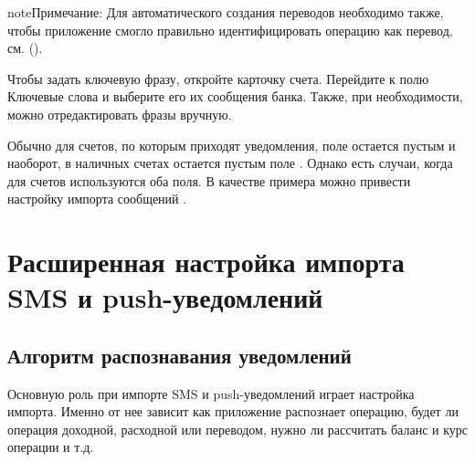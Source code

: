 \documentclass[a4paper,10pt,russian]{sphinxmanual}
\begin{document}
\begin{sphinxadmonition}{note}{Примечание:}
Для автоматического создания переводов необходимо также, чтобы приложение смогло правильно идентифицировать операцию как перевод, см. {\hyperref[\detokenize{notifications:chapter-notifications}]{}} ().
\end{sphinxadmonition}

Чтобы задать ключевую фразу, откройте карточку счета. Перейдите к полю Ключевые слова и выберите его их сообщения банка. Также, при необходимости, можно отредактировать фразы вручную.

\noindent{}

\noindent{}

\noindent{}

Обычно для счетов, по которым приходят уведомления, поле  остается пустым и наоборот, в наличных счетах
остается пустым поле . Однако есть случаи, когда для счетов используются оба поля. В качестве примера можно привести настройку
импорта сообщений .


\chapter{Расширенная настройка импорта SMS и push-уведомлений}
\label{\detokenize{notifications:sms-push}}\label{\detokenize{notifications:chapter-notifications}}\label{\detokenize{notifications::doc}}

\section{Алгоритм распознавания уведомлений}
\label{\detokenize{notifications:id1}}
Основную роль при импорте SMS и push-уведомлений играет настройка импорта. Именно от нее зависит
как приложение распознает операцию, будет ли операция доходной, расходной или переводом, нужно ли
рассчитать баланс и курс операции и т.д.
\end{document}
